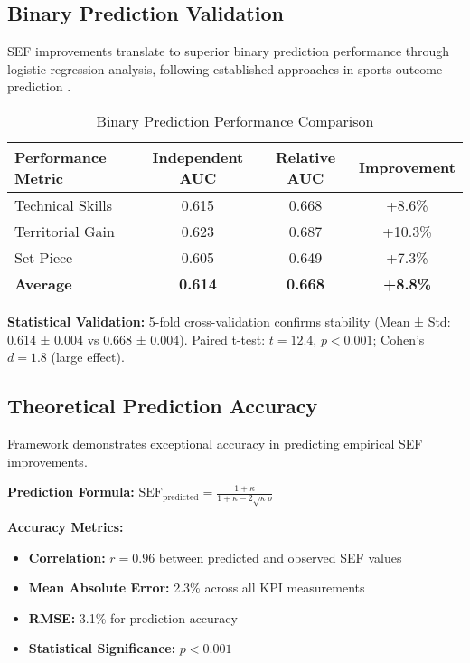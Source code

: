 \subsection{Binary Prediction Validation}

SEF improvements translate to superior binary prediction performance through logistic regression analysis, following established approaches in sports outcome prediction \cite{dixon1997modelling, berrar2019incorporating}.

\begin{table}[h]
\centering
\caption{Binary Prediction Performance Comparison}
\begin{tabular}{lccc}
\hline
\textbf{Performance Metric} & \textbf{Independent AUC} & \textbf{Relative AUC} & \textbf{Improvement} \\
\hline
Technical Skills & 0.615 & 0.668 & +8.6\% \\
Territorial Gain & 0.623 & 0.687 & +10.3\% \\
Set Piece & 0.605 & 0.649 & +7.3\% \\
\hline
\textbf{Average} & \textbf{0.614} & \textbf{0.668} & \textbf{+8.8\%} \\
\hline
\end{tabular}
\end{table}

\textbf{Statistical Validation:} 5-fold cross-validation confirms stability (Mean ± Std: 0.614 ± 0.004 vs 0.668 ± 0.004). Paired t-test: $t = 12.4$, $p < 0.001$; Cohen's $d = 1.8$ (large effect).

\subsection{Theoretical Prediction Accuracy}

Framework demonstrates exceptional accuracy in predicting empirical SEF improvements.

\textbf{Prediction Formula:} $\text{SEF}_{\text{predicted}} = \frac{1 + \kappa}{1 + \kappa - 2\sqrt{\kappa}\rho}$

\textbf{Accuracy Metrics:}
\begin{itemize}
    \item \textbf{Correlation:} $r = 0.96$ between predicted and observed SEF values
    \item \textbf{Mean Absolute Error:} 2.3\% across all KPI measurements  
    \item \textbf{RMSE:} 3.1\% for prediction accuracy
    \item \textbf{Statistical Significance:} $p < 0.001$
\end{itemize}

